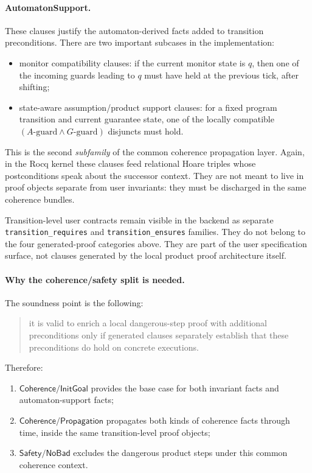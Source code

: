 \documentclass[11pt,a4paper]{article}
\begin{document}
\paragraph{AutomatonSupport.}
These clauses justify the automaton-derived facts added to transition
preconditions. There are two important subcases in the implementation:
\begin{itemize}[leftmargin=1.4em]
\item monitor compatibility clauses: if the current monitor state is \(q\),
  then one of the incoming guards leading to \(q\) must have held at the
  previous tick, after shifting;
\item state-aware assumption/product support clauses: for a fixed program
  transition and current guarantee state, one of the locally compatible
  \((A\text{-guard} \land G\text{-guard})\) disjuncts must hold.
\end{itemize}
This is the second \emph{subfamily} of the common coherence propagation layer.
Again, in the Rocq kernel these clauses feed relational Hoare triples whose
postconditions speak about the successor context. They are not meant to live in
proof objects separate from user
invariants: they must be discharged in the same coherence bundles.

Transition-level user contracts remain visible in the backend as separate
\texttt{transition\_requires} and \texttt{transition\_ensures} families. They
do not belong to the four generated-proof categories above. They are part of
the user specification surface, not clauses generated by the local product
proof architecture itself.

\paragraph{Why the coherence/safety split is needed.}
The soundness point is the following:
\begin{quote}
it is valid to enrich a local dangerous-step proof with additional
preconditions only if generated clauses separately establish that these
preconditions do hold on concrete executions.
\end{quote}
Therefore:
\begin{enumerate}[leftmargin=1.4em]
\item \(\mathsf{Coherence/InitGoal}\) provides the base case for both invariant
  facts and automaton-support facts;
\item \(\mathsf{Coherence/Propagation}\) propagates both kinds of coherence facts
  through time, inside the same transition-level proof objects;
\item \(\mathsf{Safety/NoBad}\) excludes the dangerous product steps under this
  common coherence context.
\end{enumerate}
\end{document}
